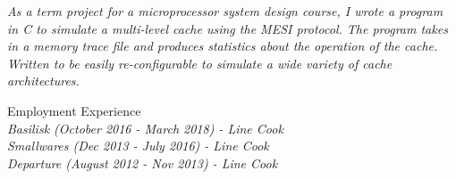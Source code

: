 \documentclass{article}
\newcommand\rightcolwidthvar{0.60}
\begin{document}
\begin{minipage}[t]{\rightcolwidthvar \textwidth}
\begin{flushleft}
\textsf{\textit{%
As a term project for a microprocessor system design course, I wrote a program in C to simulate a multi-level cache using the MESI protocol.  The program takes in a memory trace file and produces statistics about the operation of the cache.  Written to be easily re-configurable to simulate a wide variety of cache architectures.\\}}
\end{flushleft}
\begin{flushleft}
\textsf{\Large Employment Experience}\\
\smallskip
\textsf{\textit{%
Basilisk (October 2016 - March 2018) - Line Cook\\
Smallwares (Dec 2013 - July 2016) - Line Cook\\
Departure (August 2012 - Nov 2013) - Line Cook}}
\end{flushleft}
\end{minipage}

\bigskip
\end{document}
